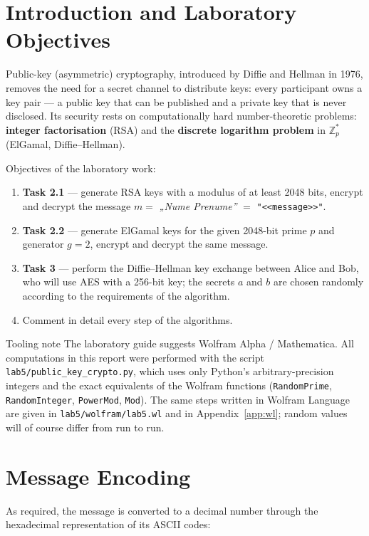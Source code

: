 \documentclass[12pt,a4paper]{article}
\begin{document}
\makereporttitle
\tableofcontents
\newpage

\section{Introduction and Laboratory Objectives}
Public-key (asymmetric) cryptography, introduced by Diffie and Hellman in 1976, removes the need
for a secret channel to distribute keys: every participant owns a key pair — a public key that
can be published and a private key that is never disclosed. Its security rests on
computationally hard number-theoretic problems: \textbf{integer factorisation} (RSA) and the
\textbf{discrete logarithm problem} in $\mathbb{Z}_p^*$ (ElGamal, Diffie–Hellman).

Objectives of the laboratory work:
\begin{enumerate}
  \item \textbf{Task 2.1} — generate RSA keys with a modulus of at least 2048 bits, encrypt and
        decrypt the message $m=$ \textit{„Nume Prenume”} $=$ \texttt{"<<message>>"}.
  \item \textbf{Task 2.2} — generate ElGamal keys for the given 2048-bit prime $p$ and generator
        $g=2$, encrypt and decrypt the same message.
  \item \textbf{Task 3} — perform the Diffie–Hellman key exchange between Alice and Bob, who will
        use AES with a 256-bit key; the secrets $a$ and $b$ are chosen randomly according to the
        requirements of the algorithm.
  \item Comment in detail every step of the algorithms.
\end{enumerate}

\begin{infobox}{Tooling note}
The laboratory guide suggests Wolfram Alpha / Mathematica. All computations in this report were
performed with the script \texttt{lab5/public\_key\_crypto.py}, which uses only Python's
arbitrary-precision integers and the exact equivalents of the Wolfram functions
(\texttt{RandomPrime}, \texttt{RandomInteger}, \texttt{PowerMod}, \texttt{Mod}). The same steps
written in Wolfram Language are given in \texttt{lab5/wolfram/lab5.wl} and in
Appendix~\ref{app:wl}; random values will of course differ from run to run.
\end{infobox}

\section{Message Encoding}
As required, the message is converted to a decimal number through the hexadecimal representation
of its ASCII codes:
\end{document}
